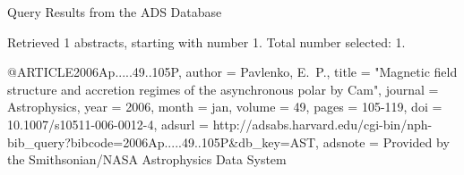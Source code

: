 Query Results from the ADS Database


Retrieved 1 abstracts, starting with number 1.  Total number selected: 1.

@ARTICLE{2006Ap.....49..105P,
   author = {{Pavlenko}, E.~P.},
    title = "{Magnetic field structure and accretion regimes of the asynchronous polar by Cam}",
  journal = {Astrophysics},
     year = 2006,
    month = jan,
   volume = 49,
    pages = {105-119},
      doi = {10.1007/s10511-006-0012-4},
   adsurl = {http://adsabs.harvard.edu/cgi-bin/nph-bib_query?bibcode=2006Ap.....49..105P&db_key=AST},
  adsnote = {Provided by the Smithsonian/NASA Astrophysics Data System}
}


